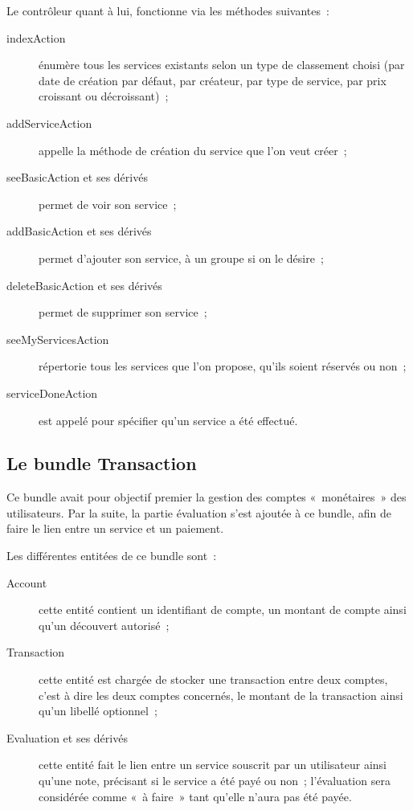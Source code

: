 Le contrôleur quant à lui, fonctionne via les méthodes suivantes~:
\begin{description}
    \item [indexAction] énumère tous les services existants selon un type de classement choisi (par date de création par défaut, par créateur, par type de service, par prix croissant ou décroissant)~;
    \item [addServiceAction] appelle la méthode de création du service que l'on veut créer~;
    \item [seeBasicAction et ses dérivés] permet de voir son service~;
    \item [addBasicAction et ses dérivés] permet d'ajouter son service, à un groupe si on le désire~;
    \item [deleteBasicAction et ses dérivés] permet de supprimer son service~;
    \item [seeMyServicesAction] répertorie tous les services que l'on propose, qu'ils soient réservés ou non~;
    \item [serviceDoneAction] est appelé pour spécifier qu'un service a été effectué.
\end{description}

\subsection{Le bundle Transaction}

Ce bundle avait pour objectif premier la gestion des comptes «~monétaires~» des utilisateurs. Par la suite, la partie évaluation s'est ajoutée à ce bundle, afin de faire le lien entre un service et un paiement.

Les différentes entitées de ce bundle sont~:
\begin{description}
    \item [Account] cette entité contient un identifiant de compte, un montant de compte ainsi qu'un découvert autorisé~;
    \item [Transaction] cette entité est chargée de stocker une transaction entre deux comptes, c'est à dire les deux comptes concernés, le montant de la transaction ainsi qu'un libellé optionnel~;
    \item [Evaluation et ses dérivés] cette entité fait le lien entre un service souscrit par un utilisateur ainsi qu'une note, précisant si le service a été payé ou non~; l'évaluation sera considérée comme «~à faire~» tant qu'elle n'aura pas été payée.
\end{description}

